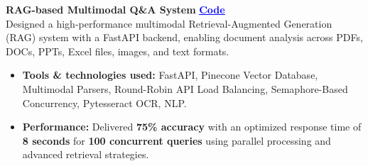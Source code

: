 \documentclass[letterpaper,10pt]{article}  %
\begin{document}
\vspace{-5pt}
\textbf{RAG-based Multimodal Q\&A System}
\href{https://github.com/Yash0030/rep6.git}{\textbar{} \textcolor{blue}{\underline{\textbf{Code}}}}\\
\vspace{1pt}
Designed a high-performance multimodal Retrieval-Augmented Generation (RAG) system with a FastAPI backend, enabling document analysis across PDFs, DOCs, PPTs, Excel files, images, and text formats.\\
\vspace{-5pt}
\begin{itemize}
\item \textbf{Tools \& technologies used:} FastAPI, Pinecone Vector Database, Multimodal Parsers, Round-Robin API Load Balancing, Semaphore-Based Concurrency, Pytesseract OCR, NLP.
\vspace{-2pt}
\item \textbf{Performance:} Delivered \textbf{75\% accuracy} with an optimized response time of \textbf{8 seconds} for \textbf{100 concurrent queries} using parallel processing and advanced retrieval strategies.
\end{itemize}



\end{document}
